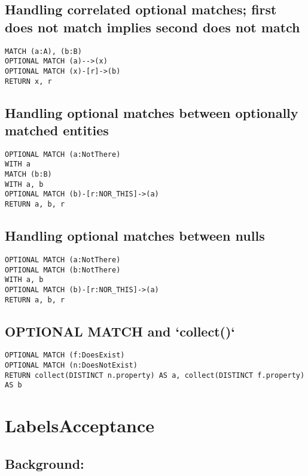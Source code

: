 \subsection{Handling correlated optional matches; first does not match implies second does not match}

\begin{lstlisting}
MATCH (a:A), (b:B)
OPTIONAL MATCH (a)-->(x)
OPTIONAL MATCH (x)-[r]->(b)
RETURN x, r
\end{lstlisting}

\subsection{Handling optional matches between optionally matched entities}

\begin{lstlisting}
OPTIONAL MATCH (a:NotThere)
WITH a
MATCH (b:B)
WITH a, b
OPTIONAL MATCH (b)-[r:NOR_THIS]->(a)
RETURN a, b, r
\end{lstlisting}

\subsection{Handling optional matches between nulls}

\begin{lstlisting}
OPTIONAL MATCH (a:NotThere)
OPTIONAL MATCH (b:NotThere)
WITH a, b
OPTIONAL MATCH (b)-[r:NOR_THIS]->(a)
RETURN a, b, r
\end{lstlisting}

\subsection{OPTIONAL MATCH and `collect()`}

\begin{lstlisting}
OPTIONAL MATCH (f:DoesExist)
OPTIONAL MATCH (n:DoesNotExist)
RETURN collect(DISTINCT n.property) AS a, collect(DISTINCT f.property) AS b
\end{lstlisting}
\section{LabelsAcceptance}


\subsection{Background:}

\begin{lstlisting}
\end{lstlisting}

